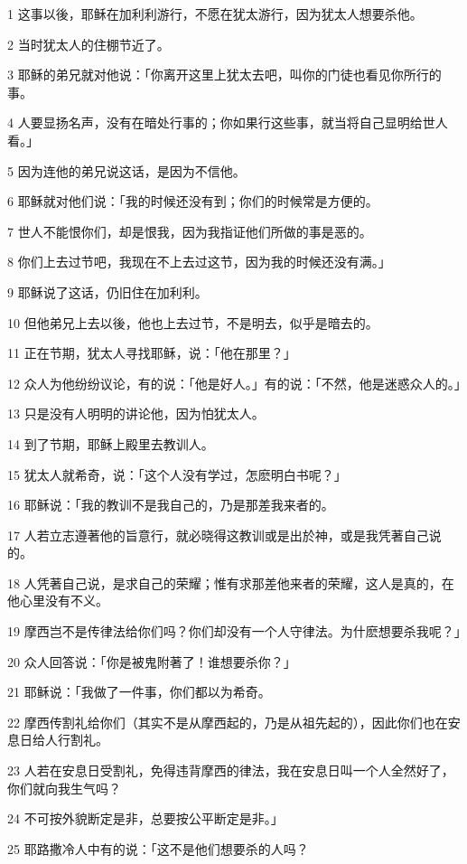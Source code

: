 \par 1 这事以後，耶稣在加利利游行，不愿在犹太游行，因为犹太人想要杀他。
\par 2 当时犹太人的住棚节近了。
\par 3 耶稣的弟兄就对他说：「你离开这里上犹太去吧，叫你的门徒也看见你所行的事。
\par 4 人要显扬名声，没有在暗处行事的；你如果行这些事，就当将自己显明给世人看。」
\par 5 因为连他的弟兄说这话，是因为不信他。
\par 6 耶稣就对他们说：「我的时候还没有到；你们的时候常是方便的。
\par 7 世人不能恨你们，却是恨我，因为我指证他们所做的事是恶的。
\par 8 你们上去过节吧，我现在不上去过这节，因为我的时候还没有满。」
\par 9 耶稣说了这话，仍旧住在加利利。
\par 10 但他弟兄上去以後，他也上去过节，不是明去，似乎是暗去的。
\par 11 正在节期，犹太人寻找耶稣，说：「他在那里？」
\par 12 众人为他纷纷议论，有的说：「他是好人。」有的说：「不然，他是迷惑众人的。」
\par 13 只是没有人明明的讲论他，因为怕犹太人。
\par 14 到了节期，耶稣上殿里去教训人。
\par 15 犹太人就希奇，说：「这个人没有学过，怎麽明白书呢？」
\par 16 耶稣说：「我的教训不是我自己的，乃是那差我来者的。
\par 17 人若立志遵著他的旨意行，就必晓得这教训或是出於神，或是我凭著自己说的。
\par 18 人凭著自己说，是求自己的荣耀；惟有求那差他来者的荣耀，这人是真的，在他心里没有不义。
\par 19 摩西岂不是传律法给你们吗？你们却没有一个人守律法。为什麽想要杀我呢？」
\par 20 众人回答说：「你是被鬼附著了！谁想要杀你？」
\par 21 耶稣说：「我做了一件事，你们都以为希奇。
\par 22 摩西传割礼给你们（其实不是从摩西起的，乃是从祖先起的），因此你们也在安息日给人行割礼。
\par 23 人若在安息日受割礼，免得违背摩西的律法，我在安息日叫一个人全然好了，你们就向我生气吗？
\par 24 不可按外貌断定是非，总要按公平断定是非。」
\par 25 耶路撒冷人中有的说：「这不是他们想要杀的人吗？
